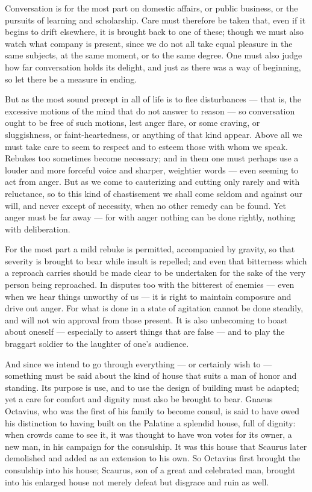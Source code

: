  Conversation is for the most part on domestic affairs, or public business, or the pursuits of learning and scholarship. Care must therefore be taken that, even if it begins to drift elsewhere, it is brought back to one of these; though we must also watch what company is present, since we do not all take equal pleasure in the same subjects, at the same moment, or to the same degree. One must also judge how far conversation holds its delight, and just as there was a way of beginning, so let there be a measure in ending.

 But as the most sound precept in all of life is to flee disturbances — that is, the excessive motions of the mind that do not answer to reason — so conversation ought to be free of such motions, lest anger flare, or some craving, or sluggishness, or faint-heartedness, or anything of that kind appear. Above all we must take care to seem to respect and to esteem those with whom we speak. Rebukes too sometimes become necessary; and in them one must perhaps use a louder and more forceful voice and sharper, weightier words — even seeming to act from anger. But as we come to cauterizing and cutting only rarely and with reluctance, so to this kind of chastisement we shall come seldom and against our will, and never except of necessity, when no other remedy can be found. Yet anger must be far away — for with anger nothing can be done rightly, nothing with deliberation.

 For the most part a mild rebuke is permitted, accompanied by gravity, so that severity is brought to bear while insult is repelled; and even that bitterness which a reproach carries should be made clear to be undertaken for the sake of the very person being reproached. In disputes too with the bitterest of enemies — even when we hear things unworthy of us — it is right to maintain composure and drive out anger. For what is done in a state of agitation cannot be done steadily, and will not win approval from those present. It is also unbecoming to boast about oneself — especially to assert things that are false — and to play the braggart soldier to the laughter of one's audience.

 And since we intend to go through everything — or certainly wish to — something must be said about the kind of house that suits a man of honor and standing. Its purpose is use, and to use the design of building must be adapted; yet a care for comfort and dignity must also be brought to bear. Gnaeus Octavius, who was the first of his family to become consul, is said to have owed his distinction to having built on the Palatine a splendid house, full of dignity: when crowds came to see it, it was thought to have won votes for its owner, a new man, in his campaign for the consulship. It was this house that Scaurus later demolished and added as an extension to his own. So Octavius first brought the consulship into his house; Scaurus, son of a great and celebrated man, brought into his enlarged house not merely defeat but disgrace and ruin as well.

